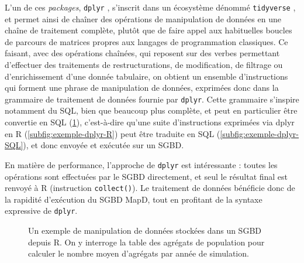 L'un de ces \textit{packages}, \texttt{dplyr} \autocite{wickham_dplyr_2015}, s'inscrit dans un écosystème dénommé \texttt{tidyverse} \autocite{wickham_tidyverse_2017}, et permet ainsi de chaîner des opérations de manipulation de données en une chaîne de traitement complète, plutôt que de faire appel aux habituelles boucles de parcours de matrices propres aux langages de programmation classiques.
Ce faisant, avec des opérations chaînées, qui reposent sur des \og verbes\fg{} permettant d'effectuer des traitements de restructurations, de modification, de filtrage ou d'enrichissement d'une donnée tabulaire, on obtient un ensemble d'instructions qui forment une \og phrase\fg{} de manipulation de données, exprimées donc dans la \og grammaire de traitement de données\fg{} fournie par \texttt{dplyr}.
Cette \og grammaire\fg{} s'inspire notamment du SQL, bien que beaucoup plus complète, et peut en particulier être \og convertie\fg{} en SQL (\cref{fig:dml-simedb}), c'est-à-dire qu'une suite d'instructions exprimées via dplyr en R (\cref{subfig:exemple-dplyr-R}) peut être traduite en SQL (\cref{subfig:exemple-dplyr-SQL}), et donc envoyée et exécutée sur un SGBD.

En matière de performance, l'approche de \texttt{dplyr} est intéressante : toutes les opérations sont effectuées par le SGBD directement, et seul le résultat final est renvoyé à R (instruction \texttt{collect()}).
Le traitement de données bénéficie donc de la rapidité d'exécution du SGBD MapD, tout en profitant de la syntaxe expressive de \texttt{dplyr}.

\begin{figure}[H]
\centering
\hspace{5pt}
\hspace{5pt}
\caption{Un exemple de manipulation de données stockées dans un SGBD depuis R. On y interroge la table des agrégats de population pour calculer le nombre moyen d'agrégats par année de simulation.}
\label{fig:dml-simedb}
\end{figure}

